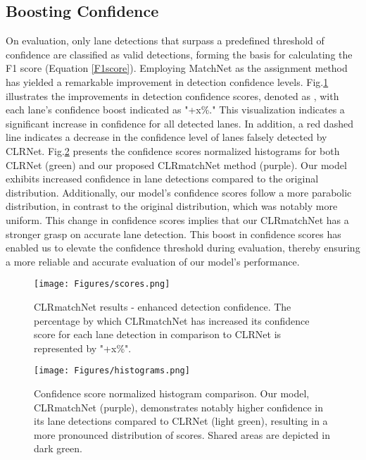 \documentclass[10pt,twocolumn,letterpaper]{article}
\begin{document}
\subsection{Boosting Confidence}
On evaluation, only lane detections that surpass a predefined threshold of confidence are classified as valid detections, forming the basis for calculating the F1 score (Equation \ref{F1score}). Employing MatchNet as the assignment method has yielded a remarkable improvement in detection confidence levels. Fig.\ref{scores} illustrates the improvements in detection confidence scores, denoted as , with each lane's confidence boost indicated as "+x\%." This visualization indicates a significant increase in confidence for all detected lanes. In addition, a red dashed line indicates a decrease in the confidence level of lanes falsely detected by CLRNet. Fig.\ref{histograms} presents the confidence scores normalized histograms for both CLRNet (green) and our proposed CLRmatchNet method (purple). Our model exhibits increased confidence in lane detections compared to the original distribution. Additionally, our model's confidence scores follow a more parabolic distribution, in contrast to the original distribution, which was notably more uniform. This change in confidence scores implies that our CLRmatchNet has a stronger grasp on accurate lane detection. This boost in confidence scores has enabled us to elevate the confidence threshold during evaluation, thereby ensuring a more reliable and accurate evaluation of our model's performance.
\begin{figure}[h]
\begin{center}
    \centering
    \texttt{[image: Figures/scores.png]}
\caption{CLRmatchNet results - enhanced detection confidence. The percentage by which CLRmatchNet has increased its confidence score for each lane detection in comparison to CLRNet is represented by "+x\%".}
\label{scores}
\end{center}
\end{figure}
\begin{figure}[h]
\begin{center}
    \centering
    \texttt{[image: Figures/histograms.png]}
\caption{Confidence score normalized histogram comparison. Our model, CLRmatchNet (purple), demonstrates notably higher confidence in its lane detections compared to CLRNet (light green), resulting in a more pronounced distribution of scores. Shared areas are depicted in dark green.}
\label{histograms}
\end{center}
\end{figure}
\end{document}
